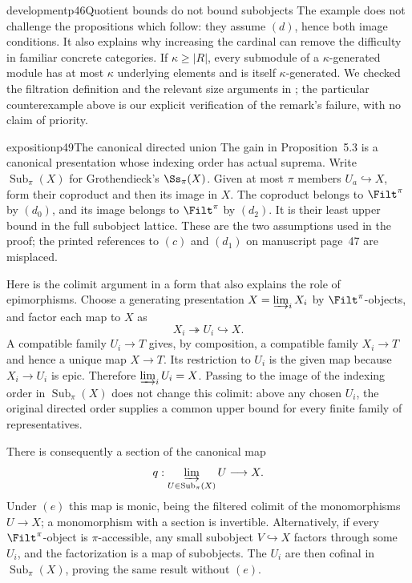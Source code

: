 \begin{dcomment}{development}{p46}{Quotient bounds do not bound subobjects}
The example does not challenge the propositions which follow: they assume $(d)$, hence both image conditions. It also explains why increasing the cardinal can remove the difficulty in familiar concrete categories. If $\kappa\geq|R|$, every submodule of a $\kappa$-generated module has at most $\kappa$ underlying elements and is itself $\kappa$-generated. We checked the filtration definition and the relevant size arguments in \citep[Expos\'e~I, 9.12--9.16]{SGA4I1972}; the particular counterexample above is our explicit verification of the remark's failure, with no claim of priority.
\end{dcomment}

\begin{dcomment}{exposition}{p49}{The canonical directed union}
The gain in Proposition~5.3 is a canonical presentation whose indexing order has actual suprema. Write $\operatorname{Sub}_{\pi}(X)$ for Grothendieck's $\Ss_{\pi}(X)$. Given at most $\pi$ members $U_a\hookrightarrow X$, form their coproduct and then its image in $X$. The coproduct belongs to $\Filt^\pi$ by $(d_0)$, and its image belongs to $\Filt^\pi$ by $(d_2)$. It is their least upper bound in the full subobject lattice. These are the two assumptions used in the proof; the printed references to $(c)$ and $(d_1)$ on manuscript page~47 are misplaced.

Here is the colimit argument in a form that also explains the role of epimorphisms. Choose a generating presentation $X=\varinjlim_iX_i$ by $\Filt^\pi$-objects, and factor each map to $X$ as
\[
 X_i\twoheadrightarrow U_i\hookrightarrow X.
\]
A compatible family $U_i\to T$ gives, by composition, a compatible family $X_i\to T$ and hence a unique map $X\to T$. Its restriction to $U_i$ is the given map because $X_i\to U_i$ is epic. Therefore $\varinjlim_iU_i=X$. Passing to the image of the indexing order in $\operatorname{Sub}_{\pi}(X)$ does not change this colimit: above any chosen $U_i$, the original directed order supplies a common upper bound for every finite family of representatives.

There is consequently a section of the canonical map
\[
 q:\varinjlim_{U\in\operatorname{Sub}_{\pi}(X)}U\longrightarrow X.
\]
Under $(e)$ this map is monic, being the filtered colimit of the monomorphisms $U\to X$; a monomorphism with a section is invertible. Alternatively, if every $\Filt^\pi$-object is $\pi$-accessible, any small subobject $V\hookrightarrow X$ factors through some $U_i$, and the factorization is a map of subobjects. The $U_i$ are then cofinal in $\operatorname{Sub}_{\pi}(X)$, proving the same result without $(e)$.


\end{dcomment}
